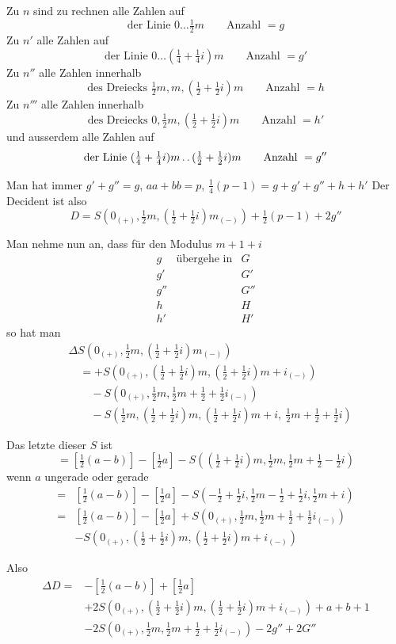 Zu $n$ sind zu rechnen alle Zahlen auf
\[
\text{der Linie }0\ldots\tfrac12m\qquad\text{Anzahl }=g
\]
Zu $n'$ alle Zahlen auf
\[
\text{der Linie }0\ldots(\tfrac14+\tfrac14i)m\qquad\text{Anzahl }=g'
\]
Zu $n''$ alle Zahlen innerhalb
\[
\text{des Dreiecks }\tfrac12m,m,(\tfrac12+\tfrac12i)m\qquad\text{Anzahl }=h
\]
Zu $n'''$ alle Zahlen innerhalb
\[
\text{des Dreiecks }0,\tfrac12m,(\tfrac12+\tfrac12i)m\qquad\text{Anzahl }=h'
\]
und ausserdem alle Zahlen auf
\[
\text{der Linie }(\tfrac14+\tfrac14i)m\mathinner{.\,.}(\tfrac12+\tfrac12i)m\qquad\text{Anzahl }=g''
\]

Man hat immer $g'+g''=g$, $aa+bb=p$, $\frac14(p-1)=g+g'+g''+h+h'$ Der Decident ist also
%
\[
D=S(0_{(+)},\tfrac12m,(\tfrac12+\tfrac12i)m_{(-)})+\tfrac12(p-1)+2g''
\]

Man nehme nun an, dass für den Modulus $m+1+i$
\[
\begin{array}{clc}
g&\text{übergehe in}&G\\
g'&&G'\\
g''&&G''\\
h&&H\\
h'&&H'
\end{array}
\]
so hat man
\[
\begin{aligned}
&\Delta S(0_{(+)},\tfrac12m,(\tfrac12+\tfrac12i)m_{(-)})\\
&\quad=+S(0_{(+)},(\tfrac12+\tfrac12i)m,(\tfrac12+\tfrac12i)m+i_{(-)})\\
&\qquad-S(0_{(+)},\tfrac12m,\tfrac12m+\tfrac12+\tfrac12i_{(-)})\\
&\qquad-S(\tfrac12m,(\tfrac12+\tfrac12i)m,(\tfrac12+\tfrac12i)m+i,\ \tfrac12m+\tfrac12+\tfrac12i)
\end{aligned}
\]

Das letzte dieser $S$ ist
\[
=\left[\tfrac12(a-b)\right]-\left[\tfrac12a\right]-S((\tfrac12+\tfrac12i)m,\tfrac12m,\tfrac12m+\tfrac12-\tfrac12i)
\]
wenn $a$ ungerade oder gerade
\[
\begin{aligned}
={}&\left[\tfrac12(a-b)\right]-\left[\tfrac12a\right]-S(-\tfrac12+\tfrac12i,\tfrac12m-\tfrac12+\tfrac12i,\tfrac12m+i)\\
={}&\left[\tfrac12(a-b)\right]-\left[\tfrac12a\right]+S(0_{(+)},\tfrac12m,\tfrac12m+\tfrac12+\tfrac12i_{(-)})\\
&-S(0_{(+)},(\tfrac12+\tfrac12i)m,(\tfrac12+\tfrac12i)m+i_{(-)})
\end{aligned}
\]

Also
\[
\begin{aligned}
\Delta D={}&-\left[\tfrac12(a-b)\right]+\left[\tfrac12a\right]\\
&+2S(0_{(+)},(\tfrac12+\tfrac12i)m,(\tfrac12+\tfrac12i)m+i_{(-)})+a+b+1\\
&-2S(0_{(+)},\tfrac12m,\tfrac12m+\tfrac12+\tfrac12i_{(-)})-2g''+2G''
\end{aligned}
\]

